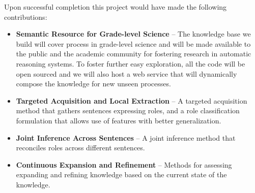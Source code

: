 Upon successful completion this project would have made the following contributions:
\begin{itemize}
\item {\bf Semantic Resource for Grade-level Science} -- The knowledge base we build will cover process in grade-level science and will be made available to the public and the academic community 
for fostering research in automatic reasoning systems. To foster further easy exploration, all the code will be open sourced and we will also host a web service that will dynamically compose the knowledge for new unseen processes. 
\item {\bf Targeted Acquisition and Local Extraction} -- A targeted acquisition method that gathers sentences expressing roles, and a role classification formulation that allows use of features with better generalization.
\item {\bf Joint Inference Across Sentences} -- A joint inference method that reconciles roles across different sentences.  
\item {\bf Continuous Expansion and Refinement} -- Methods for assessing expanding and refining knowledge based on the current state of the knowledge.
\end{itemize}



